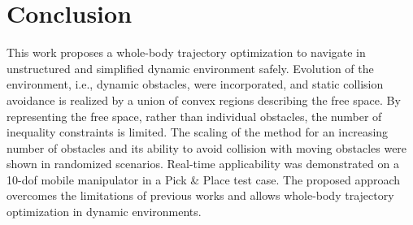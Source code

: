 \section{Conclusion}%
\label{sec:icra21_conclusion}

This work proposes a whole-body trajectory optimization to navigate in unstructured and simplified dynamic environment safely. Evolution of the environment, i.e., dynamic obstacles, were incorporated, and static collision avoidance is realized by a union of convex regions describing the free space. By representing the free space, rather than individual obstacles, the number of inequality constraints is limited. The scaling of the method for an increasing number of obstacles and its ability to avoid collision with moving obstacles were shown in randomized scenarios.
Real-time applicability was demonstrated on a 10-\ac{dof} mobile manipulator in a Pick \& Place test case.
The proposed approach overcomes the limitations of previous works and allows whole-body trajectory optimization in dynamic environments. %
%
%
\iffalse
It was shown that coupling of the motion of the mobile robot and the mounted arm dramatically reduces total operational time of the robotic system.

This work proposed an MPC formulation for coupled motion of mobile manipulators using
convex region decomposition to allow safe motions in unknown environments and to reduce
the overall execution time of navigation tasks compared to decoupled approaches.  A new
formulation for collision avoidance in unknown environments was introduced that can fuse
various sensor inputs to create free space regions around individual links.  Simulation
results in randomized test cases show that the gained flexibility by the approach results
in an increase in number of feasible trajectories. At the same time parallelizing the
motion reduces the operation time by $38\%$ on average. The fact that no collision
happened during the test cases highlights the advantage of having guarantees provided by
the MPC formulation. In future works, improved prediction algorithms, which are already
used in mobile robotics, could be integrated. Besides, close-to-singular configurations
that are not prevented in the current formulation, should be addressed in the future.
\fi

